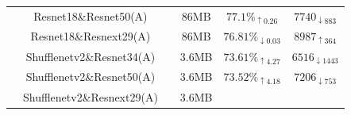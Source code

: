\begin{table}[]
\begin{tabular}{lccccc}
		& Resnet18\&Resnet50(A)  &                     &86MB  &$77.1\%_{\uparrow 0.26}$           &$7740_{\downarrow 883}$                \\
		& Resnet18\&Resnext29(A) &                   &86MB    &$76.81\%_{\downarrow 0.03}$           &$8987_{\uparrow 364}$                \\
		& Shufflenetv2\&Resnet34(A)    &                   &3.6MB    &$73.61\%_{\uparrow 4.27}$            &$6516_{\downarrow 1443}$                \\
		& Shufflenetv2\&Resnet50(A)     &                   &3.6MB    &$73.52\%_{\uparrow 4.18}$             &$7206_{\downarrow 753}$                \\
		& Shufflenetv2\&Resnext29(A)   &           &3.6MB       &     &   \\\toprule            
	\end{tabular}
\end{table}
%
%
